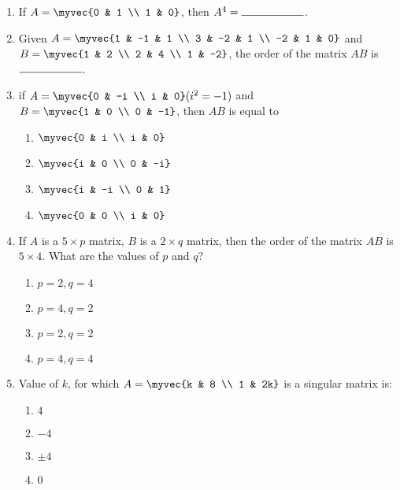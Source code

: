 \documentclass{article}
\begin{document}
\begin{enumerate}
    \item If $A = \myvec{0 & 1 \\ 1 & 0}$, then $A^4 = \rule{2cm}{0.15mm}$.

    \item Given $A = \myvec{1 & -1 & 1 \\ 3 & -2 & 1 \\ -2 & 1 & 0}$ and
    $B = \myvec{1 & 2 \\ 2 & 4 \\ 1 & -2}$, the order of the matrix $AB$ is $\rule{2cm}{0.15mm}$.
    
    \item if $A = \myvec{0 & -i \\ i & 0} (i^2 = -1)$ and  $B = \myvec{1 & 0 \\ 0 & -1}$, then $AB$ is equal to
    \begin{enumerate}
        \item $\myvec{0 & i \\ i & 0}$
        \item $\myvec{i & 0 \\ 0 & -i}$
        \item $\myvec{i & -i \\ 0 & 1}$
        \item $\myvec{0 & 0 \\ i & 0}$
    \end{enumerate}
   
   \item If $A$ is a $5 \times p$ matrix, $B$ is a $2 \times q$ matrix, then the order of the matrix $AB$ is $5 \times 4$. What are the values of $p$ and $q$?
   \begin{enumerate}
       \item $p = 2, q = 4$
       \item $p = 4, q = 2$
       \item $p = 2, q = 2$
       \item $p = 4, q = 4$
   \end{enumerate}

   \item Value of $k$, for which $A =\myvec{k & 8 \\ 1 & 2k}$ is a singular matrix is:
    \begin{enumerate}
        \item $4$
        \item $-4$
        \item $\pm4$
        \item $0$
    \end{enumerate}
        


\end{enumerate}
\end{document}
